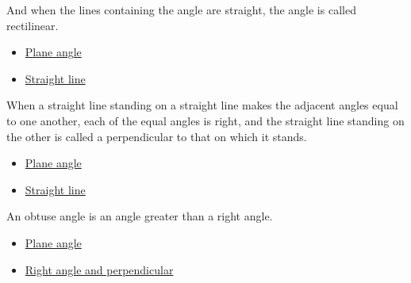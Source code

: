 \begin{definition}
\label{def-euclid-rectilinear-angle}
And when the lines containing the angle are straight, the angle is called
rectilinear.
\end{definition}
\begin{lra-not-visible}
\begin{dependencies}
\begin{itemize}
  \item \hyperref[def-euclid-plane-angle]{Plane angle}
  \item \hyperref[def-euclid-straight-line]{Straight line}
\end{itemize}
\end{dependencies}
\end{lra-not-visible}

\begin{definition}
\label{def-euclid-right-angle-and-perpendicular}
When a straight line standing on a straight line makes the adjacent angles equal
to one another, each of the equal angles is right, and the straight line
standing on the other is called a perpendicular to that on which it stands.
\end{definition}
\begin{lra-not-visible}
\begin{dependencies}
\begin{itemize}
  \item \hyperref[def-euclid-plane-angle]{Plane angle}
  \item \hyperref[def-euclid-straight-line]{Straight line}
\end{itemize}
\end{dependencies}
\end{lra-not-visible}

\begin{definition}
\label{def-euclid-obtuse-angle}
An obtuse angle is an angle greater than a right angle.
\end{definition}
\begin{lra-not-visible}
\begin{dependencies}
\begin{itemize}
  \item \hyperref[def-euclid-plane-angle]{Plane angle}
  \item \hyperref[def-euclid-right-angle-and-perpendicular]{Right angle and perpendicular}
\end{itemize}
\end{dependencies}
\end{lra-not-visible}

